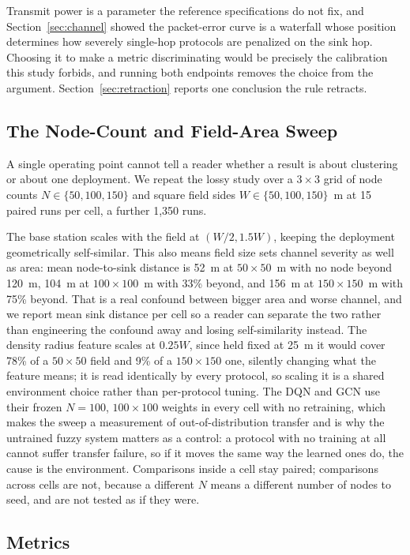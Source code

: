 Transmit power is a parameter the reference specifications do not fix, and
Section~\ref{sec:channel} showed the packet-error curve is a waterfall whose
position determines how severely single-hop protocols are penalized on the sink
hop. Choosing it to make a metric discriminating would be precisely the
calibration this study forbids, and running both endpoints removes the choice
from the argument. Section~\ref{sec:retraction} reports one conclusion the rule
retracts.

\subsection{The Node-Count and Field-Area Sweep}
\label{sec:scale-design}

A single operating point cannot tell a reader whether a result is about
clustering or about one deployment. We repeat the lossy study over a $3\times3$
grid of node counts $N \in \{50, 100, 150\}$ and square field sides
$W \in \{50, 100, 150\}$~m at 15 paired runs per cell, a further 1{,}350 runs.

The base station scales with the field at $(W/2, 1.5W)$, keeping the deployment
geometrically self-similar. This also means field size sets channel severity as
well as area: mean node-to-sink distance is 52~m at $50\times50$~m with no node
beyond 120~m, 104~m at $100\times100$~m with 33\% beyond, and 156~m at
$150\times150$~m with 75\% beyond. That is a real confound between bigger area
and worse channel, and we report mean sink distance per cell so a reader can
separate the two rather than engineering the confound away and losing
self-similarity instead. The density radius feature scales at $0.25W$, since
held fixed at 25~m it would cover 78\% of a $50\times50$ field and 9\% of a
$150\times150$ one, silently changing what the feature means; it is read
identically by every protocol, so scaling it is a shared environment choice
rather than per-protocol tuning. The DQN and GCN use their frozen $N = 100$,
$100\times100$ weights in every cell with no retraining, which makes the sweep a
measurement of out-of-distribution transfer and is why the untrained fuzzy
system matters as a control: a protocol with no training at all cannot suffer
transfer failure, so if it moves the same way the learned ones do, the cause is
the environment. Comparisons inside a cell stay paired; comparisons across cells
are not, because a different $N$ means a different number of nodes to seed, and
are not tested as if they were.

\subsection{Metrics}
\label{sec:metrics}

